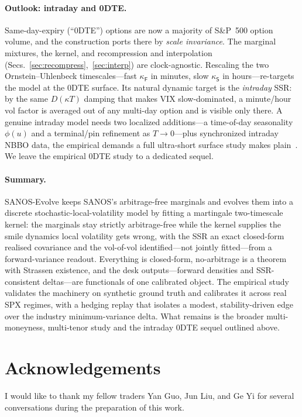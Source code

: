 \documentclass[11pt]{article}
\begin{document}
\paragraph{Outlook: intraday and 0DTE.}\label{sec:intraday}
Same-day-expiry (``0DTE'') options are now a majority of S\&P~500 option volume, and the
construction ports there by \emph{scale invariance}. The marginal mixtures, the kernel, and recompression and interpolation
(Secs.~\ref{sec:recompress},~\ref{sec:interp}) are clock-agnostic. Rescaling the two
Ornstein--Uhlenbeck timescales---fast $\kappa_{\mathsf{F}}$ in minutes, slow $\kappa_{\mathsf{S}}$
in hours---re-targets the model at the 0DTE surface. Its natural dynamic target is the \emph{intraday} SSR: by the same
$D(\kappa T)$ damping that makes VIX slow-dominated, a minute/hour vol factor is averaged out
of any multi-day option and is visible only there. A genuine intraday model needs two localized
additions---a time-of-day seasonality $\phi(u)$ and a terminal/pin refinement as $T\to0$---plus synchronized intraday NBBO data, the empirical demands a full ultra-short surface study makes plain~\cite{bandi2026}. We leave the
empirical 0DTE study to a dedicated sequel.

\paragraph{Summary.}
SANOS-Evolve keeps SANOS's arbitrage-free marginals and evolves them into a discrete
stochastic-local-volatility model by fitting a martingale two-timescale kernel: the marginals stay
strictly arbitrage-free while the kernel supplies the smile dynamics local volatility gets wrong,
with the SSR an exact closed-form realised covariance and the vol-of-vol identified---not jointly
fitted---from a forward-variance readout. Everything is closed-form, no-arbitrage is a theorem with
Strassen existence, and the desk outputs---forward densities and SSR-consistent
deltas---are functionals of one calibrated object. The empirical study validates the machinery on
synthetic ground truth and calibrates it across real SPX regimes, with a hedging replay that isolates
a modest, stability-driven edge over the industry minimum-variance delta. What remains is the broader
multi-moneyness, multi-tenor study and the intraday 0DTE sequel outlined above.

\section*{Acknowledgements}
I would like to thank my fellow traders Yan Guo, Jun Liu, and Ge Yi for several conversations during the preparation of this work.
\end{document}
